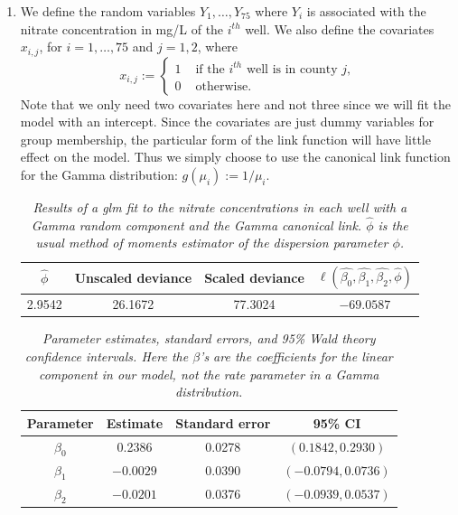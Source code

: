 \documentclass[12pt]{article}
\begin{document}
\newpage

\begin{enumerate}
  \item We define the random variables $Y_{1}, \dots, Y_{75}$ where $Y_{i}$ is associated with the nitrate concentration in mg/L of the $i^{th}$ well.
    We also define the covariates $x_{i,j}$, for $i = 1,
    \hdots, 75$ and $j = 1,2$, where
    \[
      x_{i,j} := \left\{ \begin{array}{cl}
          1 & \text{ if the $i^{th}$ well is in county $j$,} \\
          0 & \text{ otherwise}.
      \end{array} \right.
    \]
    Note that we only need two covariates here and not three since we will fit the model with an intercept.
    Since the covariates are just dummy variables for group membership, the particular form of the link function will have little effect on the model.
    Thus we simply choose to use the canonical link function for the Gamma distribution: $g(\mu_i) := 1 / \mu_i$.
    

    \begin{table}[h]
      \caption{\emph{Results of a glm fit to the nitrate concentrations in each well with a Gamma random component and the Gamma canonical link.
      $\hat{\phi}$ is the usual method of moments estimator of the dispersion parameter $\phi$.}}
      \vspace{.5cm}
      \centering
      \begin{tabular}{|c|c|c|c|}
        \hline
        $\hat{\phi}$ & Unscaled deviance & Scaled deviance & $\ell(\hat{\beta_0}, \hat{\beta_1}, \hat{\beta_2}, \hat{\phi})$ \\
        \hline
        2.9542 & 26.1672 & 77.3024 & $-69.0587$ \\
        \hline
      \end{tabular}
      \label{tab:1}
    \end{table}


    \begin{table}[h]
      \caption{\emph{Parameter estimates, standard errors, and 95\% Wald theory confidence intervals. Here the $\beta$'s are the coefficients for the
      linear component in our model, not the rate parameter in a Gamma distribution.}}
      \vspace{.5cm}
      \centering
      \begin{tabular}{|c|c|c|c|}
        \hline
        Parameter & Estimate & Standard error & 95\% CI \\
        \hline
        $\beta_0$ & 0.2386 & 0.0278 & $(0.1842,0.2930)$ \\
        \hline
        $\beta_1$ & $-0.0029$ & 0.0390 & $(-0.0794, 0.0736)$ \\
        \hline
        $\beta_2$ & $-0.0201$ & 0.0376 & $(-0.0939, 0.0537)$ \\
        \hline
      \end{tabular}
      \label{tab:2}
    \end{table}


\end{enumerate}
\end{document}
